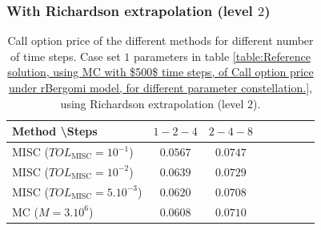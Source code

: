 \subsubsection*{With Richardson extrapolation (level $2$)}
\FloatBarrier
\begin{table}[h!]
	\centering
	\begin{tabular}{l*{6}{c}r}
		Method \textbackslash  Steps           &$1-2-4$ & $2-4-8$ \\
		\hline
		
		MISC ($TOL_{\text{MISC}}=10^{-1}$)  &$0.0567$  &$0.0747$   \\
		MISC ($TOL_{\text{MISC}}=10^{-2}$)  & $		0.0639$ & $0.0729$   \\
		MISC ($TOL_{\text{MISC}}=5.10^{-3}$)  & $	0.0620$ & $0.0708$   \\
		\hline
		MC ($M=3.10^6$)  & $0.0608$ & $0.0710$   \\
		\hline 
	\end{tabular}
	\caption{ Call option price of the different methods for different number of time steps.  Case set $1$ parameters in table \ref{table:Reference solution, using MC with $500$ time steps, of Call option price under rBergomi model, for different parameter constellation.}, using Richardson extrapolation (level $2$).}
	\label{table: Call option price of the different methods for different number of time steps. Case $K=1$, using Richardson extrapolation_level2}
\end{table}

\FloatBarrier


